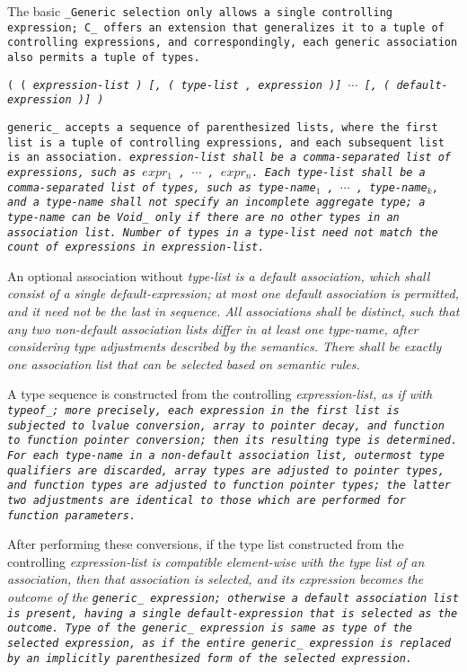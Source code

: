 The basic \tt{_Generic} selection only allows a single controlling expression;
C\_ offers an extension that generalizes it to a tuple of controlling expressions,
and correspondingly, each generic association also permits a tuple of types.


 \tt{( (} \it{expression-list} \tt{)}
[\tt{, (} \it{type-list} \tt{,} \it{expression} \tt{)}] $\cdots$
[\tt{, (} \it{default-expression} \tt{)}]
\tt{)}


\tt{generic_} accepts a sequence of parenthesized lists, where the first list is
a tuple of controlling expressions, and each subsequent list is an association.
\it{expression-list} shall be a comma-separated list of expressions,
such as $expr_1$ \tt{,} $\cdots$ \tt{,} $expr_n$.
Each \it{type-list} shall be a comma-separated list of types,
such as \it{type-name}$_1$ \tt{,} $\cdots$ \tt{,} \it{type-name}$_k$, and a
\it{type-name} shall not specify an incomplete aggregate type; a \it{type-name}
can be \tt{Void_} only if there are no other types in an association list.
Number of types in a \it{type-list} need not match
the count of expressions in \it{expression-list}.

An optional association without \it{type-list} is a default association,
which shall consist of a single \it{default-expression}; at most one
default association is permitted, and it need not be the last in sequence.
All associations shall be distinct, such that any two non-default
association lists differ in at least one \it{type-name},
after considering type adjustments described by the semantics.
There shall be exactly one association list
that can be selected based on semantic rules.


A type sequence is constructed from the controlling \it{expression-list},
as if with \tt{typeof_}; more precisely, each expression in the first list
is subjected to lvalue conversion, array to pointer decay, and function
to function pointer conversion; then its resulting type is determined.
For each \it{type-name} in a non-default association list,
outermost type qualifiers are discarded, array types are adjusted to pointer
types, and function types are adjusted to function pointer types; the latter two
adjustments are identical to those which are performed for function parameters.

After performing these conversions, if the type list constructed from the
controlling \it{expression-list} is compatible element-wise with the type list of
an association, then that association is selected, and its expression becomes the
outcome of the \tt{generic_} expression; otherwise a default association list is
present, having a single \it{default-expression} that is selected as the outcome.
Type of the \tt{generic_} expression is same as type of the selected expression,
as if the entire \tt{generic_} expression is replaced by an
implicitly parenthesized form of the selected expression.


